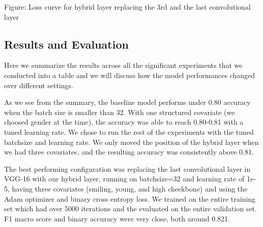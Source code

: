 \documentclass[12pt]{article}
\begin{document}
Figure: Loss curve for hybrid layer replacing the 3rd and the last convolutional layer

\subsection{Results and Evaluation}
Here we summarize the results across all the significant experiments that we conducted into a table and we will discuss how the model performances changed over different settings. 

As we see from the summary, the baseline model performs under 0.80 accuracy when the batch size is smaller than 32. With one structured covariate (we choosed gender at the time), the accuracy was able to reach 0.80-0.81 with a tuned learning rate. We chose to run the rest of the experiments with the tuned batchsize and learning rate. We only moved the position of the hybrid layer when we had three covariates, and the resulting accuracy was consistently above 0.81. 

The best performing configuration was replacing the last convolutional layer in VGG-16 with our hybrid layer, running on batchsize=32 and learning rate of 1e-5, having three covariates (smiling, young, and high cheekbone) and using the Adam optimizer and binary cross entropy loss. We trained on the entire training set which had over 5000 iterations and the evaluated on the entire validation set. F1 macro score and binary accuracy were very close, both around 0.821. 
\end{document}

